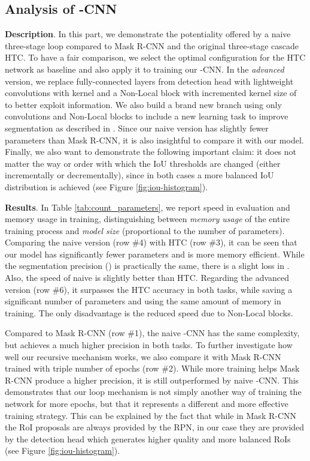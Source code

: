 \documentclass[runningheads, orivec]{llncs}
\begin{document}
\subsection{Analysis of -CNN}
\noindent\textbf{Description}.
In this part, we demonstrate the potentiality offered by a naive three-stage loop compared to Mask R-CNN and the original three-stage cascade HTC.
To have a fair comparison, we select the optimal configuration for the HTC network as baseline and also apply it to training our -CNN. 
In the \textit{advanced} version, we replace fully-connected layers from detection head with lightweight convolutions with kernel  and a Non-Local block \cite{wang2018non} with incremented kernel size of  to better exploit information.
We also build a brand new branch using only convolutions and Non-Local blocks to include a new learning task to improve segmentation as described in \cite{huang2019mask}.
Since our naive version has slightly fewer parameters than Mask R-CNN, it is also insightful to compare it with our model.
Finally, we also want to demonstrate the following important claim: it does not matter the way or order with which the IoU thresholds are changed (either incrementally or decrementally), since in both cases a more balanced IoU distribution is achieved (see Figure \ref{fig:iou-histogram}).

\noindent\textbf{Results}.
In Table \ref{tab:count_parameters}, we report speed in evaluation and memory usage in training, distinguishing between \textit{memory usage} of the entire training process and \textit{model size} (proportional to the number of parameters). 
Comparing the naive version (row \#4) with HTC (row \#3), it can be seen that our model has significantly fewer parameters and is more memory efficient.
While the segmentation precision () is practically the same, there is a slight loss in .
Also, the speed of naive is slightly better than HTC.
Regarding the advanced version (row \#6), it surpasses the HTC accuracy in both tasks, while saving a significant number of parameters and using the same amount of memory in training.
The only disadvantage is the reduced speed due to Non-Local blocks.

Compared to Mask R-CNN (row \#1), the naive -CNN has the same complexity, but achieves a much higher precision in both tasks.
To further investigate how well our recursive mechanism works, we also compare it with Mask R-CNN trained with triple number of epochs (row \#2).
While more training helps Mask R-CNN produce a higher precision, it is still outperformed by naive -CNN. This demonstrates that our loop mechanism is not simply another way of training the network for more epochs, but that it represents a different and more effective training strategy. This can be explained by the fact that while in Mask R-CNN the RoI proposals are always provided by the RPN, in our case they are provided by the detection head which generates higher quality and more balanced RoIs (see Figure \ref{fig:iou-histogram}).
\end{document}
